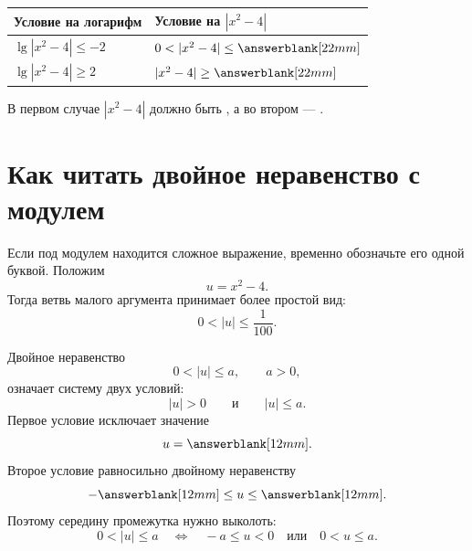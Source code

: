 \begin{fillbox}
  \begin{center}
    \renewcommand{\arraystretch}{1.75}
    \begin{tabularx}{0.93\textwidth}{@{}
      >{\centering\arraybackslash}p{}
      >{\centering\arraybackslash}X@{}}
      \toprule
      \rowcolor{TableHeader}
      Условие на логарифм & Условие на \(|x^2-4|\) \\
      \midrule
      \(\lg|x^2-4|\le-2\) & \(0<|x^2-4|\le\answerblank[22mm]\) \\
      \addlinespace[0.35em]
      \(\lg|x^2-4|\ge2\) & \(|x^2-4|\ge\answerblank[22mm]\) \\
      \bottomrule
    \end{tabularx}
  \end{center}
\end{fillbox}

\argregimesstudentfigure

\begin{reflectionbox}
  В первом случае \(|x^2-4|\) должно быть \answerblank[45mm],
  а во втором — \answerblank[45mm].
\end{reflectionbox}

\section{Как читать двойное неравенство с модулем}

\begin{methodintro}
  Если под модулем находится сложное выражение, временно обозначьте его
  одной буквой. Положим
  \[
    u=x^2-4.
  \]
  Тогда ветвь малого аргумента принимает более простой вид:
  \[
    0<|u|\le\frac1{100}.
  \]
\end{methodintro}

\begin{fillbox}
  Двойное неравенство
  \[
    0<|u|\le a,\qquad a>0,
  \]
  означает систему двух условий:
  \[
    |u|>0
    \qquad\text{и}\qquad
    |u|\le a.
  \]
  Первое условие исключает значение
  \[
    u=\answerblank[12mm].
  \]
  Второе условие равносильно двойному неравенству
  \[
    -\answerblank[12mm]\le u\le\answerblank[12mm].
  \]
  Поэтому середину промежутка нужно выколоть:
  \[
    0<|u|\le a
    \quad\Longleftrightarrow\quad
    -a\le u<0
    \quad\text{или}\quad
    0<u\le a.
  \]
\end{fillbox}

